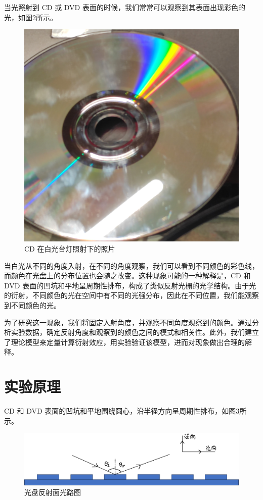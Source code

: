 \documentclass[fontset=windows]{article}
\begin{document}
当光照射到 CD 或 DVD 表面的时候，我们常常可以观察到其表面出现彩色的光，如图2所示。

\begin{figure}[htbp]
	\centering
	\includegraphics[scale=0.05]{lines.jpg}
	\caption{CD 在白光台灯照射下的照片}
	\label{2}
\end{figure}

当白光从不同的角度入射，在不同的角度观察，我们可以看到不同颜色的彩色线，而颜色在光盘上的分布位置也会随之改变。这种现象可能的一种解释是，CD 和 DVD 表面的凹坑和平地呈周期性排布，构成了类似反射光栅的光学结构。由于光的衍射，不同颜色的光在空间中有不同的光强分布，因此在不同位置，我们能观察到不同颜色的光。

为了研究这一现象，我们将固定入射角度，并观察不同角度观察到的颜色。通过分析实验数据，确定反射角度和观察到的颜色之间的模式和相关性。此外，我们建立了理论模型来定量计算衍射效应，用实验验证该模型，进而对现象做出合理的解释。

\section{实验原理}

CD 和 DVD 表面的凹坑和平地围绕圆心，沿半径方向呈周期性排布，如图3所示。

\begin{figure}[htbp]
	\centering
	\includegraphics[scale=0.5]{2.png}
	\caption{光盘反射面光路图}
	\label{3}
\end{figure}
\end{document}
